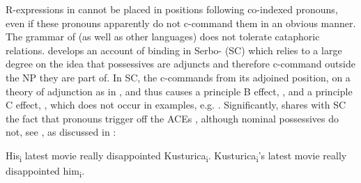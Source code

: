 \documentclass[output=paper,nonflat,colorlinks,citecolor=brown,newtxmath]{langsci/langscibook}
\begin{document}
\noindent R-expressions in  cannot be placed in positions following co-indexed pronouns, even if these pronouns apparently do not c-command them in an obvious manner. The grammar of  (as well as other  languages) does not tolerate cataphoric relations. \cite{despic2011,despic2013,despic2015} develops an account of binding in Serbo- (SC) which relies to a large degree on the idea that  possessives are adjuncts and therefore c-command outside the NP they are part of. In SC, the  c-commands from its adjoined position, on a theory of adjunction as in \cite{kayne1994}, and thus causes a principle B effect, , and a principle C effect, , which does not occur in  examples, e.g. . Significantly,  shares with SC the fact that  pronouns trigger off the ACEs , although nominal possessives do not, see , as discussed in \cite{witkos2015}:

\ea\label{ex:witkos:17}
\ea His\textsubscript{i} latest movie really disappointed Kusturica\textsubscript{i}.
\ex Kusturica\textsubscript{i}’s latest movie really disappointed him\textsubscript{i}.
\z\z

\ea \label{ex:witkos:18}
\z
\z

\ea \label{ex:witkos:19}
	\z
\z
\end{document}
